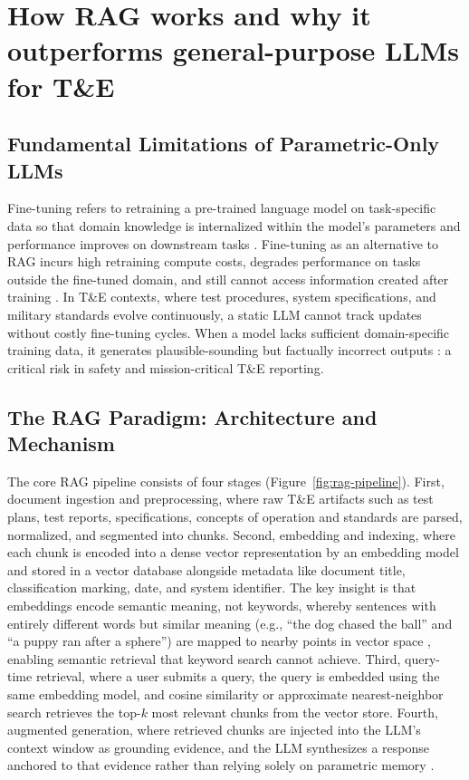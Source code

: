 \documentclass[12pt,letterpaper]{article}
\let\cite\parencite
\begin{document}
\section{How RAG works and why it outperforms general-purpose LLMs for T\&E}

\subsection{Fundamental Limitations of Parametric-Only LLMs}

Fine-tuning refers to retraining a pre-trained language model on task-specific data so that domain knowledge is internalized within the model's parameters and performance improves on downstream tasks \cite{lewis2020,gao2023,ibm2025}. Fine-tuning as an alternative to RAG incurs high retraining compute costs, degrades performance on tasks outside the fine-tuned domain, and still cannot access information created after training \cite{kirkpatrick2017,stackoverflow2023,f22labs2024}. In T\&E contexts, where test procedures, system specifications, and military standards evolve continuously, a static LLM cannot track updates without costly fine-tuning cycles. When a model lacks sufficient domain-specific training data, it generates plausible-sounding but factually incorrect outputs \cite{gao2023}: a critical risk in safety and mission-critical T\&E reporting.

\subsection{The RAG Paradigm: Architecture and Mechanism}

The core RAG pipeline consists of four stages (Figure~\ref{fig:rag-pipeline}). First, document ingestion and preprocessing, where raw T\&E artifacts such as test plans, test reports, specifications, concepts of operation and standards are parsed, normalized, and segmented into chunks. Second, embedding and indexing, where each chunk is encoded into a dense vector representation by an embedding model and stored in a vector database alongside metadata like document title, classification marking, date, and system identifier. The key insight is that embeddings encode semantic meaning, not keywords, whereby sentences with entirely different words but similar meaning (e.g., ``the dog chased the ball'' and ``a puppy ran after a sphere'') are mapped to nearby points in vector space \cite{reimers2019}, enabling semantic retrieval that keyword search cannot achieve. Third, query-time retrieval, where a user submits a query, the query is embedded using the same embedding model, and cosine similarity or approximate nearest-neighbor search retrieves the top-$k$ most relevant chunks from the vector store. Fourth, augmented generation, where retrieved chunks are injected into the LLM's context window as grounding evidence, and the LLM synthesizes a response anchored to that evidence rather than relying solely on parametric memory \cite{aws2025,ibm2025}.
\end{document}
